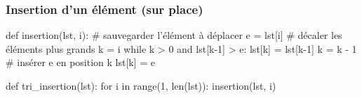 \documentclass[12pt]{linfo-beamer}
\begin{document}

\begin{frame}[fragile]
 \frametitle{Insertion d'un élément (sur place)}

\begin{pyframe}{}
def insertion(lst, i):
    # sauvegarder l'élément à déplacer
    e = lst[i]
    # décaler les éléments plus grands
    k = i
    while k > 0 and lst[k-1] > e:
        lst[k] = lst[k-1]
        k = k - 1
    # insérer e en position k
    lst[k] = e
\end{pyframe}



\begin{pyframe}{}
def tri_insertion(lst):
    for i in range(1, len(lst)):
        insertion(lst, i)
\end{pyframe}
\end{frame}
\end{document}
